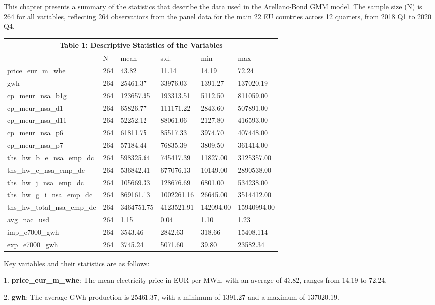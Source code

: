 \documentclass[12pt]{article}
\begin{document}
This chapter presents a summary of the statistics that describe the data used in the Arellano-Bond GMM model. The sample size (N) is 264 for all variables, reflecting 264 observations from the panel data for the main 22 EU countries across 12 quarters, from 2018 Q1 to 2020 Q4.

\begin{tabular}{ p{4.2cm} p{2cm} p{2cm} p{2cm} p{2cm} p{2cm}   }

 \multicolumn{6}{c}{Table 1: Descriptive Statistics of the Variables} \\
  \hline
  &N&mean&s.d.&min&max\\
 \hline
 price\_eur\_m\_whe&264&43.82&11.14&14.19&72.24\\
 gwh&264&25461.37&33976.03&1391.27&137020.19\\
cp\_meur\_nsa\_b1g&264&123657.95&193313.51&5112.50&811059.00\\
cp\_meur\_nsa\_d1&264&65826.77&111171.22&2843.60&507891.00\\
cp\_meur\_nsa\_d11&264&52252.12&88061.06&2127.80&416593.00\\
cp\_meur\_nsa\_p6&264&61811.75&85517.33&3974.70&407448.00\\
cp\_meur\_nsa\_p7&264&57184.44&76835.39&3809.50&361414.00\\
ths\_hw\_b\_e\_nsa\_emp\_dc&264&598325.64&745417.39&11827.00&3125357.00\\
ths\_hw\_c\_nsa\_emp\_dc&264&536842.41&677076.13&10149.00&2890538.00\\
ths\_hw\_j\_nsa\_emp\_dc&264&105669.33&128676.69&6801.00&534238.00\\
ths\_hw\_g\_i\_nsa\_emp\_dc&264&869161.13&1002261.16&26645.00&3514412.00\\
ths\_hw\_total\_nsa\_emp\_dc&264&3464751.75&4123521.91&142094.00&15940994.00\\
 avg\_nac\_usd&264&1.15&0.04&1.10&1.23\\
imp\_e7000\_gwh&264&3543.46&2842.63&318.66&15408.114\\
exp\_e7000\_gwh&264&3745.24&5071.60&39.80&23582.34\\
 
 \hline
\end{tabular}

Key variables and their statistics are as follows:

1.	\textbf{price\_eur\_m\_whe}: The mean electricity price in EUR per MWh, with an average of 43.82, ranges from 14.19 to 72.24.

2.	\textbf{gwh}: The average GWh production is 25461.37, with a minimum of 1391.27 and a maximum of 137020.19.
\end{document}
